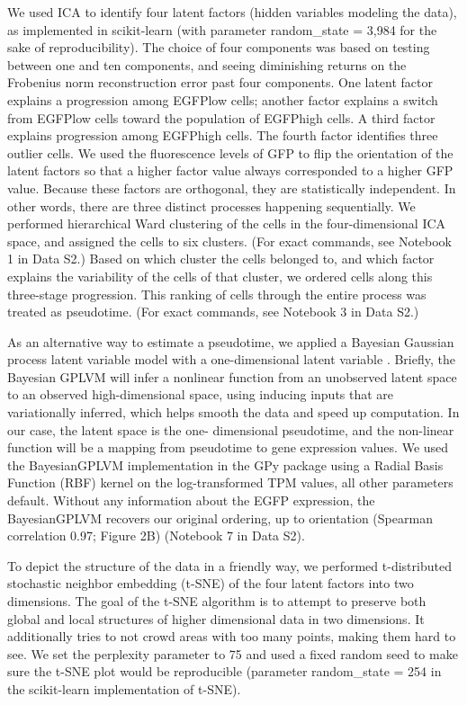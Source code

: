 We used ICA \cite{Hyvarinen2000-vi} to identify four latent factors (hidden variables modeling the data), as implemented in scikit-learn (with parameter random\_state = 3,984 for the sake of reproducibility). The choice of four components was based on testing between one and ten components, and seeing diminishing returns on the Frobenius norm reconstruction error past four components. One latent factor explains a progression among EGFPlow cells; another factor explains a switch from EGFPlow cells toward the population of EGFPhigh cells. A third factor explains progression among EGFPhigh cells. The fourth factor identifies three outlier cells. We used the fluorescence levels of GFP to flip the orientation of the latent factors so that a higher factor value always corresponded to a higher GFP value. Because these factors are orthogonal, they are statistically independent. In other words, there are three distinct processes happening sequentially. We performed hierarchical Ward clustering \cite{Ward1963-hr} of the cells in the four-dimensional ICA space, and assigned the cells to six clusters. (For exact commands, see Notebook 1 in Data S2.) Based on which cluster the cells belonged to, and which factor explains the variability of the cells of that cluster, we ordered cells along this three-stage progression. This ranking of cells through the entire process was treated as pseudotime. (For exact commands, see Notebook 3 in Data S2.)

As an alternative way to estimate a pseudotime, we applied a Bayesian Gaussian process latent variable model with a one-dimensional latent variable \cite{Titsias2010-hq}. Briefly, the Bayesian GPLVM will infer a nonlinear function from an unobserved latent space to an observed high-dimensional space, using inducing inputs that are variationally inferred, which helps smooth the data and speed up computation. In our case, the latent space is the one- dimensional pseudotime, and the non-linear function will be a mapping from pseudotime to gene expression values. We used the BayesianGPLVM implementation in the GPy package using a Radial Basis Function (RBF) kernel on the log-transformed TPM values, all other parameters default. Without any information about the EGFP expression, the BayesianGPLVM recovers our original ordering, up to orientation (Spearman correlation 0.97; Figure 2B) (Notebook 7 in Data S2).

To depict the structure of the data in a friendly way, we performed t-distributed stochastic neighbor embedding (t-SNE) \cite{Van_der_Maaten2008-lh} of the four latent factors into two dimensions. The goal of the t-SNE algorithm is to attempt to preserve both global and local structures of higher dimensional data in two dimensions. It additionally tries to not crowd areas with too many points, making them hard to see. We set the perplexity parameter to 75 and used a fixed random seed to make sure the t-SNE plot would be reproducible (parameter random\_state = 254 in the scikit-learn implementation of t-SNE).

